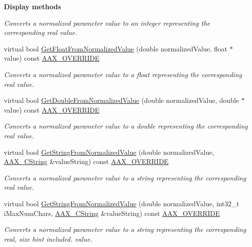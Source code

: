 \begin{Indent}{\bf Display methods}
\begin{DoxyCompactItemize}
\begin{DoxyCompactList}\small\item\em Converts a normalized parameter value to an integer representing the corresponding real value. \end{DoxyCompactList}\item 
virtual bool \hyperlink{a00033_ae4d87c067f3b5ac290fda64d36d2bab7}{Get\+Float\+From\+Normalized\+Value} (double normalized\+Value, float $\ast$value) const \hyperlink{a00149_ac2f24a5172689ae684344abdcce55463}{A\+A\+X\+\_\+\+O\+V\+E\+R\+R\+I\+D\+E}
\begin{DoxyCompactList}\small\item\em Converts a normalized parameter value to a float representing the corresponding real value. \end{DoxyCompactList}\item 
virtual bool \hyperlink{a00033_aab66e9fc07a5593e5353014c9b5801eb}{Get\+Double\+From\+Normalized\+Value} (double normalized\+Value, double $\ast$value) const \hyperlink{a00149_ac2f24a5172689ae684344abdcce55463}{A\+A\+X\+\_\+\+O\+V\+E\+R\+R\+I\+D\+E}
\begin{DoxyCompactList}\small\item\em Converts a normalized parameter value to a double representing the corresponding real value. \end{DoxyCompactList}\item 
virtual bool \hyperlink{a00033_ae29f9d2663b8813e47abccecd8d9a606}{Get\+String\+From\+Normalized\+Value} (double normalized\+Value, \hyperlink{a00042}{A\+A\+X\+\_\+\+C\+String} \&value\+String) const \hyperlink{a00149_ac2f24a5172689ae684344abdcce55463}{A\+A\+X\+\_\+\+O\+V\+E\+R\+R\+I\+D\+E}
\begin{DoxyCompactList}\small\item\em Converts a normalized parameter value to a string representing the corresponding real value. \end{DoxyCompactList}\item 
virtual bool \hyperlink{a00033_a16409f9cf67b4b01172fe2090d258c82}{Get\+String\+From\+Normalized\+Value} (double normalized\+Value, int32\+\_\+t i\+Max\+Num\+Chars, \hyperlink{a00042}{A\+A\+X\+\_\+\+C\+String} \&value\+String) const \hyperlink{a00149_ac2f24a5172689ae684344abdcce55463}{A\+A\+X\+\_\+\+O\+V\+E\+R\+R\+I\+D\+E}
\begin{DoxyCompactList}\small\item\em Converts a normalized parameter value to a string representing the corresponding real, size hint included. value. \end{DoxyCompactList}\item 

\end{DoxyCompactItemize}
\end{Indent}
